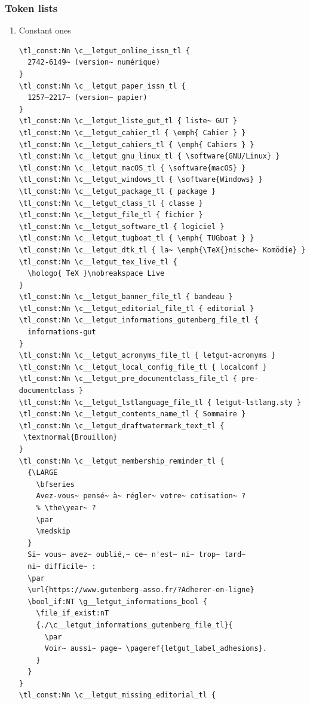 \documentclass{letgut}
\begin{document}
\subsubsection{Token lists}
\label{ImplementationDeclarationsTokenlists-grbg55h0jlj0}
\begin{enumerate}
\item Constant ones
\label{ImplementationDeclarationsTokenlistsConstantones-obcg55h0jlj0}
\begin{lstlisting}
\tl_const:Nn \c__letgut_online_issn_tl {
  2742-6149~ (version~ numérique)
}
\tl_const:Nn \c__letgut_paper_issn_tl {
  1257–2217~ (version~ papier)
}
\tl_const:Nn \c__letgut_liste_gut_tl { liste~ GUT }
\tl_const:Nn \c__letgut_cahier_tl { \emph{ Cahier } }
\tl_const:Nn \c__letgut_cahiers_tl { \emph{ Cahiers } }
\tl_const:Nn \c__letgut_gnu_linux_tl { \software{GNU/Linux} }
\tl_const:Nn \c__letgut_macOS_tl { \software{macOS} }
\tl_const:Nn \c__letgut_windows_tl { \software{Windows} }
\tl_const:Nn \c__letgut_package_tl { package }
\tl_const:Nn \c__letgut_class_tl { classe }
\tl_const:Nn \c__letgut_file_tl { fichier }
\tl_const:Nn \c__letgut_software_tl { logiciel }
\tl_const:Nn \c__letgut_tugboat_tl { \emph{ TUGboat } }
\tl_const:Nn \c__letgut_dtk_tl { la~ \emph{\TeX{}nische~ Komödie} }
\tl_const:Nn \c__letgut_tex_live_tl {
  \hologo{ TeX }\nobreakspace Live
}
\tl_const:Nn \c__letgut_banner_file_tl { bandeau }
\tl_const:Nn \c__letgut_editorial_file_tl { editorial }
\tl_const:Nn \c__letgut_informations_gutenberg_file_tl {
  informations-gut
}
\tl_const:Nn \c__letgut_acronyms_file_tl { letgut-acronyms }
\tl_const:Nn \c__letgut_local_config_file_tl { localconf }
\tl_const:Nn \c__letgut_pre_documentclass_file_tl { pre-documentclass }
\tl_const:Nn \c__letgut_lstlanguage_file_tl { letgut-lstlang.sty }
\tl_const:Nn \c__letgut_contents_name_tl { Sommaire }
\tl_const:Nn \c__letgut_draftwatermark_text_tl {
 \textnormal{Brouillon}
}
\tl_const:Nn \c__letgut_membership_reminder_tl {
  {\LARGE
    \bfseries
    Avez-vous~ pensé~ à~ régler~ votre~ cotisation~ ?
    % \the\year~ ?
    \par
    \medskip
  }
  Si~ vous~ avez~ oublié,~ ce~ n'est~ ni~ trop~ tard~
  ni~ difficile~ :
  \par
  \url{https://www.gutenberg-asso.fr/?Adherer-en-ligne}
  \bool_if:NT \g__letgut_informations_bool {
    \file_if_exist:nT
    {./\c__letgut_informations_gutenberg_file_tl}{
      \par
      Voir~ aussi~ page~ \pageref{letgut_label_adhesions}.
    }
  }
}
\tl_const:Nn \c__letgut_missing_editorial_tl {

\end{lstlisting}
\end{enumerate}
\end{document}
